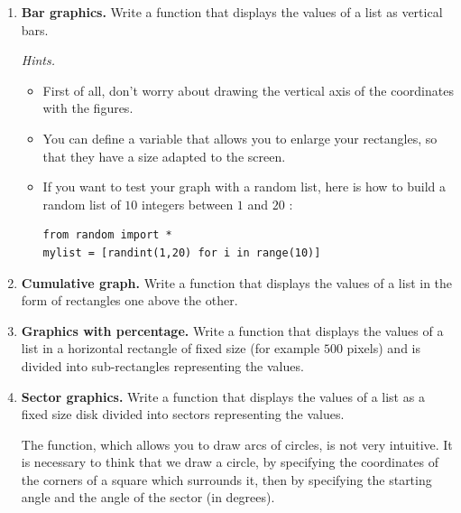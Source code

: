 \documentclass[11pt,class=report,crop=false]{standalone}
\begin{document}
\begin{activite}[Graphics]
\begin{enumerate}
  \item \textbf{Bar graphics.} Write a function  that displays the values of a list as vertical bars.
  


 \emph{Hints.}
  \begin{itemize}
    \item First of all, don't worry about drawing the vertical axis of the coordinates with the figures.
    \item You can define a variable  that allows you to enlarge your rectangles, so that they have a size adapted to the screen.
    \item If you want to test your graph with a random list, here is how to build a random list of $10$ integers between $1$ and $20$ :
    
\begin{lstlisting}
from random import *
mylist = [randint(1,20) for i in range(10)]
\end{lstlisting}

\end{itemize}

  \item \textbf{Cumulative graph.} Write a function  that displays the values of a list in the form of rectangles one above the other.
  

  
  \item \textbf{Graphics with percentage.} Write a function  that displays the values of a list in a horizontal rectangle of fixed size (for example $500$ pixels) and is divided into sub-rectangles representing the values.
  


  \item \textbf{Sector graphics.} Write a function  that displays the values of a list as a fixed size disk divided into sectors representing the values. 
 
The  function, which allows you to draw arcs of circles, is not very intuitive. It is necessary to think that we draw a circle, by specifying the coordinates of the corners of a square which surrounds it, then by specifying the starting angle and the angle of the sector (in degrees). 




\end{enumerate}
\end{activite}
\end{document}
